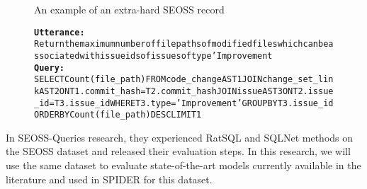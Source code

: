 \begin{figure}[H]
    \label{fig:SESS2}
    \begin{AIbox}{An example of an extra-hard SEOSS record}
        \vspace{-5px}
        \parbox{1\textwidth}{\scriptsize
        \begin{alltt} 
            {\bf Utterance:} \\ 
            Return  the maximum number of file paths of modified files which can be associated with issue ids of issues of type 'Improvement
            \\
            {\bf Query:} \\
            SELECT Count(file\_path) FROM code\_change AS T1 JOIN change\_set\_link AS T2 ON T1.commit\_hash = T2.commit\_hash JOIN issue AS T3 ON T2.issue\_id = T3.issue\_id WHERE T3.type = 'Improvement' GROUP BY T3.issue\_id ORDER BY Count(file\_path) DESC LIMIT 1
        \end{alltt}
        }
        \vspace{-5px}
    \end{AIbox}
\end{figure}
In SEOSS-Queries\cite{TOMOVA2022108211} research, they experienced RatSQL and SQLNet methods on the SEOSS dataset and released their evaluation steps. In this research, we will use the same dataset to evaluate state-of-the-art models currently available in the literature and used in SPIDER for this dataset.
